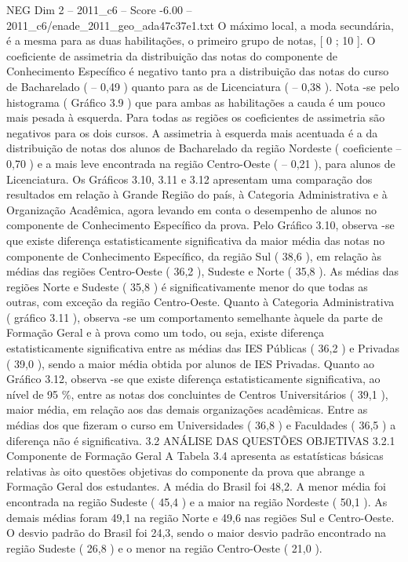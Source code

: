\begin{textsample}{NEG Dim 2 – 2011\_c6 – Score -6.00 – 2011\_c6/enade\_2011\_geo\_ada47c37e1.txt}
O máximo local, a moda secundária, é a mesma para as duas habilitações, o primeiro grupo de notas, [ 0 ; 10 ].
O coeficiente de assimetria da distribuição das notas do componente de Conhecimento Específico é negativo tanto pra a distribuição das notas do curso de Bacharelado ( – 0,49 ) quanto para as de Licenciatura ( – 0,38 ).
Nota -se pelo histograma ( Gráfico 3.9 ) que para ambas as habilitações a cauda é um pouco mais pesada à esquerda.
Para todas as regiões os coeficientes de assimetria são negativos para os dois cursos.
A assimetria à esquerda mais acentuada é a da distribuição de notas dos alunos de Bacharelado da região Nordeste ( coeficiente – 0,70 ) e a mais leve encontrada na região Centro-Oeste ( – 0,21 ), para alunos de Licenciatura.
Os Gráficos 3.10, 3.11 e 3.12 apresentam uma comparação dos resultados em relação à Grande Região do país, à Categoria Administrativa e à Organização Acadêmica, agora levando em conta o desempenho de alunos no componente de Conhecimento Específico da prova.
Pelo Gráfico 3.10, observa -se que existe diferença estatisticamente significativa da maior média das notas no componente de Conhecimento Específico, da região Sul ( 38,6 ), em relação às médias das regiões Centro-Oeste ( 36,2 ), Sudeste e Norte ( 35,8 ).
As médias das regiões Norte e Sudeste ( 35,8 ) é significativamente menor do que todas as outras, com exceção da região Centro-Oeste.
Quanto à Categoria Administrativa ( gráfico 3.11 ), observa -se um comportamento semelhante àquele da parte de Formação Geral e à prova como um todo, ou seja, existe diferença estatisticamente significativa entre as médias das IES Públicas ( 36,2 ) e Privadas ( 39,0 ), sendo a maior média obtida por alunos de IES Privadas.
Quanto ao Gráfico 3.12, observa -se que existe diferença estatisticamente significativa, ao nível de 95 \%, entre as notas dos concluintes de Centros Universitários ( 39,1 ), maior média, em relação aos das demais organizações acadêmicas.
Entre as médias dos que fizeram o curso em Universidades ( 36,8 ) e Faculdades ( 36,5 ) a diferença não é significativa. 3.2 ANÁLISE DAS QUESTÕES OBJETIVAS 3.2.1 Componente de Formação Geral A Tabela 3.4 apresenta as estatísticas básicas relativas às oito questões objetivas do componente da prova que abrange a Formação Geral dos estudantes.
A média do Brasil foi 48,2.
A menor média foi encontrada na região Sudeste ( 45,4 ) e a maior na região Nordeste ( 50,1 ).
As demais médias foram 49,1 na região Norte e 49,6 nas regiões Sul e Centro-Oeste.
O desvio padrão do Brasil foi 24,3, sendo o maior desvio padrão encontrado na região Sudeste ( 26,8 ) e o menor na região Centro-Oeste ( 21,0 ).

\end{textsample}

